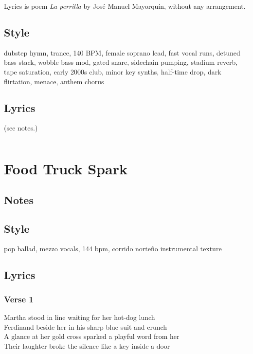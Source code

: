 Lyrics is poem \emph{La perrilla} by José Manuel Mayorquín, without any
arrangement.

\subsection{Style}\label{style-37}

dubstep hymn, trance, 140 BPM, female soprano lead, fast vocal runs,
detuned bass stack, wobble bass mod, gated snare, sidechain pumping,
stadium reverb, tape saturation, early 2000s club, minor key synths,
half-time drop, dark flirtation, menace, anthem chorus

\subsection{Lyrics}\label{lyrics-37}

(see notes.)

\begin{center}\rule{0.5\linewidth}{0.5pt}\end{center}

\section{Food Truck Spark}\label{food-truck-spark}

\subsection{Notes}\label{notes-39}

\subsection{Style}\label{style-38}

pop ballad, mezzo vocals, 144 bpm, corrido norteño instrumental texture

\subsection{Lyrics}\label{lyrics-38}

\subsubsection{Verse 1}\label{verse-1-31}

Martha stood in line waiting for her hot-dog lunch\\
Ferdinand beside her in his sharp blue suit and crunch\\
A glance at her gold cross sparked a playful word from her\\
Their laughter broke the silence like a key inside a door

